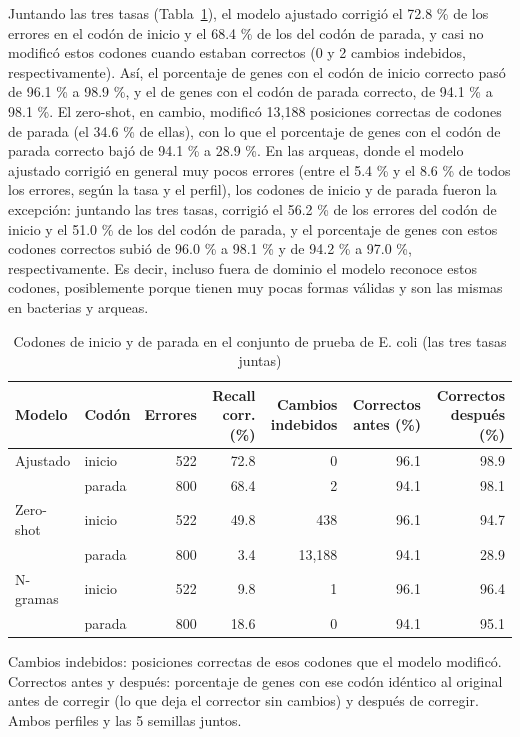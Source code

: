 \documentclass[sigconf,nonacm]{acmart}
\begin{document}
Juntando las tres tasas (Tabla~\ref{tab:inicio-parada}), el modelo ajustado corrigió el 72.8 \% de los errores en el codón de inicio y el 68.4 \% de los del codón de parada, y casi no modificó estos codones cuando estaban correctos (0 y 2 cambios indebidos, respectivamente). Así, el porcentaje de genes con el codón de inicio correcto pasó de 96.1 \% a 98.9 \%, y el de genes con el codón de parada correcto, de 94.1 \% a 98.1 \%. El zero-shot, en cambio, modificó 13,188 posiciones correctas de codones de parada (el 34.6 \% de ellas), con lo que el porcentaje de genes con el codón de parada correcto bajó de 94.1 \% a 28.9 \%. En las arqueas, donde el modelo ajustado corrigió en general muy pocos errores (entre el 5.4 \% y el 8.6 \% de todos los errores, según la tasa y el perfil), los codones de inicio y de parada fueron la excepción: juntando las tres tasas, corrigió el 56.2 \% de los errores del codón de inicio y el 51.0 \% de los del codón de parada, y el porcentaje de genes con estos codones correctos subió de 96.0 \% a 98.1 \% y de 94.2 \% a 97.0 \%, respectivamente. Es decir, incluso fuera de dominio el modelo reconoce estos codones, posiblemente porque tienen muy pocas formas válidas y son las mismas en bacterias y arqueas.

\begin{table}[t]
\caption{Codones de inicio y de parada en el conjunto de prueba de E. coli (las tres tasas juntas)}
\label{tab:inicio-parada}
\small
\begin{tabular}{llrrrrr}
\toprule
\textbf{Modelo} & \textbf{Codón} & \textbf{Errores} & \textbf{Recall corr. (\%)} & \textbf{Cambios indebidos} & \textbf{Correctos antes (\%)} & \textbf{Correctos después (\%)} \\
\midrule
Ajustado & inicio & 522 & 72.8 & 0 & 96.1 & 98.9 \\
 & parada & 800 & 68.4 & 2 & 94.1 & 98.1 \\
\midrule
Zero-shot & inicio & 522 & 49.8 & 438 & 96.1 & 94.7 \\
 & parada & 800 & 3.4 & 13,188 & 94.1 & 28.9 \\
\midrule
N-gramas & inicio & 522 & 9.8 & 1 & 96.1 & 96.4 \\
 & parada & 800 & 18.6 & 0 & 94.1 & 95.1 \\
\bottomrule
\end{tabular}

\vspace{2pt}\begin{minipage}{\textwidth}\footnotesize Cambios indebidos: posiciones correctas de esos codones que el modelo modificó. Correctos antes y después: porcentaje de genes con ese codón idéntico al original antes de corregir (lo que deja el corrector sin cambios) y después de corregir. Ambos perfiles y las 5 semillas juntos.\end{minipage}
\end{table}
\end{document}

